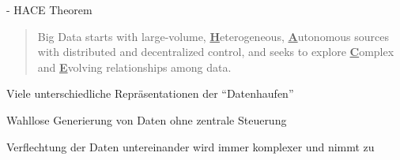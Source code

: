 \documentclass[fleqn,11pt,aspectratio=43]{beamer}
\begin{document}
\begin{frame}[fragile]{\insertsectionhead - HACE Theorem \cite{wu2014data}}
\begin{quote}
Big Data starts with large-volume, \underline{\textbf{H}}eterogeneous, 
\underline{\textbf{A}}utonomous sources with distributed and decentralized control, 
and seeks to explore \underline{\textbf{C}}omplex and \underline{\textbf{E}}volving relationships 
among data.
\end{quote} %
\begin{description}\setlength{\itemsep}{15pt}
\item[{\parbox[t]{4cm}{Huge Heterogeneous Data:}}] {\parbox[t]{6.3cm}{Viele unterschiedliche Repräsentationen der \enquote{Datenhaufen}}}
\item[{\parbox[t]{4cm}{Autonomous Sources:}}] {\parbox[t]{6.3cm}{Wahllose Generierung von Daten ohne zentrale Steuerung}}
\item[{\parbox[t]{4cm}{Complex and Evolving Relationships:}}] {\parbox[t]{6.3cm}{Verflechtung der Daten untereinander wird immer komplexer und nimmt zu}}
\end{description}
\end{frame}
\end{document}
